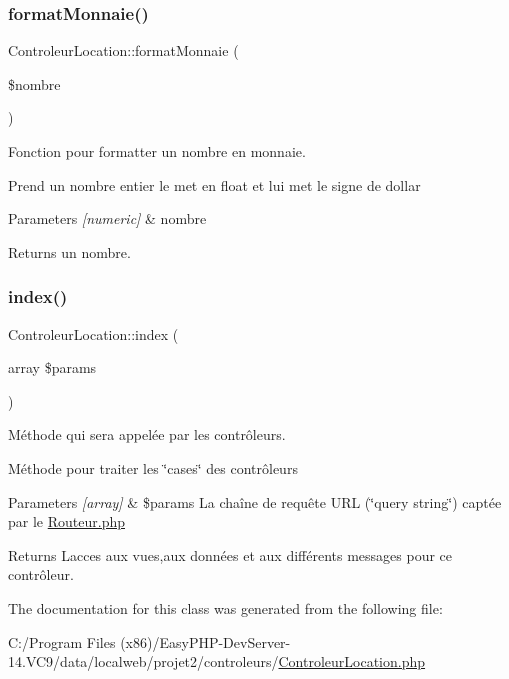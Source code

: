 \subsubsection{\texorpdfstring{format\+Monnaie()}{formatMonnaie()}}
{\footnotesize\ttfamily Controleur\+Location\+::format\+Monnaie (\begin{DoxyParamCaption}\item[{}]{\$nombre }\end{DoxyParamCaption})}



Fonction pour formatter un nombre en monnaie. 

Prend un nombre entier le met en float et lui met le signe de dollar 
\begin{DoxyParams}{Parameters}
{\em \mbox{[}numeric\mbox{]}} & nombre \\
\hline
\end{DoxyParams}
\begin{DoxyReturn}{Returns}
un nombre. 
\end{DoxyReturn}
\mbox{\label{class_controleur_location_aecb1f92f10f3fc774ae8c5c4cc7a165d}} 
\subsubsection{\texorpdfstring{index()}{index()}}
{\footnotesize\ttfamily Controleur\+Location\+::index (\begin{DoxyParamCaption}\item[{array}]{\$params }\end{DoxyParamCaption})}



Méthode qui sera appelée par les contrôleurs. 

Méthode pour traiter les \char`\"{}cases\char`\"{} des contrôleurs 
\begin{DoxyParams}{Parameters}
{\em \mbox{[}array\mbox{]}} & \$params La chaîne de requête U\+RL (\char`\"{}query string\char`\"{}) captée par le \hyperlink{_routeur_8php}{Routeur.\+php} \\
\hline
\end{DoxyParams}
\begin{DoxyReturn}{Returns}
L\textquotesingle{}acces aux vues,aux données et aux différents messages pour ce contrôleur. 
\end{DoxyReturn}


The documentation for this class was generated from the following file\+:\begin{DoxyCompactItemize}
\item 
C\+:/\+Program Files (x86)/\+Easy\+P\+H\+P-\/\+Dev\+Server-\/14.\+V\+C9/data/localweb/projet2/controleurs/\hyperlink{_controleur_location_8php}{Controleur\+Location.\+php}\end{DoxyCompactItemize}
